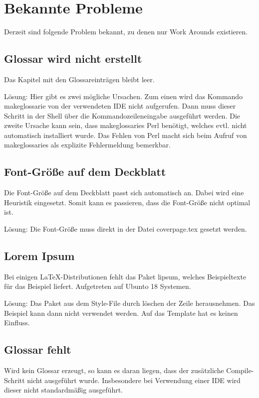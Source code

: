 %
\section{Bekannte Probleme}\label{sec:knownissues}
Derzeit sind folgende Problem bekannt, zu denen nur Work Arounds existieren.

\subsection{Glossar wird nicht erstellt}
Das Kapitel mit den Glossareinträgen bleibt leer.

Lösung: Hier gibt es zwei mögliche Ursachen. Zum einen wird das Kommando makeglossarie von der verwendeten IDE nicht aufgerufen. Dann muss dieser Schritt in der Shell über die Kommandozeileneingabe ausgeführt werden. Die zweite Ursache kann sein, dass makeglossaries Perl benötigt, welches evtl. nicht automatisch installiert wurde. Das Fehlen von Perl macht sich beim Aufruf von makeglossaries als explizite Fehlermeldung bemerkbar.

\subsection{Font-Größe auf dem Deckblatt}
Die Font-Größe auf dem Deckblatt passt sich automatisch an. Dabei wird eine Heuristik eingesetzt. Somit kann es passieren, dass die Font-Größe nicht optimal ist.

Lösung: Die Font-Größe muss direkt in der Datei coverpage.tex gesetzt werden.

\subsection{Lorem Ipsum}
Bei einigen \LaTeX -Distributionen fehlt das Paket lipsum, welches Beispieltexte für das Beispiel liefert. Aufgetreten auf  Ubunto 18 Systemen.

Lösung: Das Paket aus dem Style-File durch löschen der Zeile herausnehmen. Das Beispiel kann dann nicht verwendet werden. Auf das Template hat es keinen Einfluss.

\subsection{Glossar fehlt}
Wird kein Glossar erzeugt, so kann es daran liegen, dass der zusätzliche Compile-Schritt nicht ausgeführt wurde. Insbesondere bei Verwendung einer IDE wird dieser nicht standardmäßig ausgeführt.
